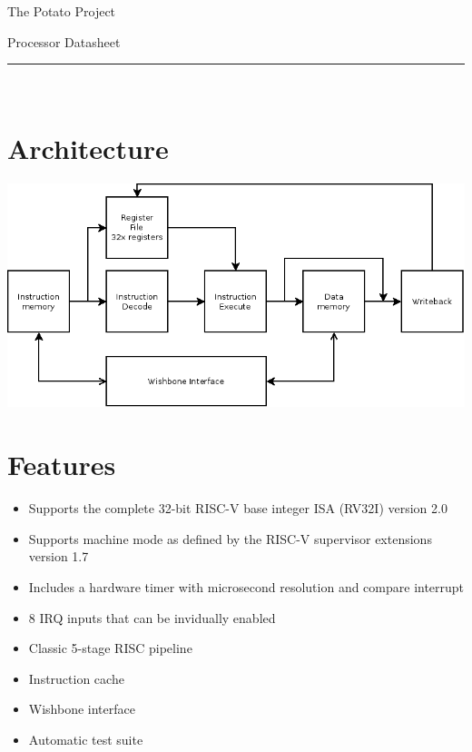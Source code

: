 \documentclass[10pt,a4paper]{article}
\begin{document}
\begin{minipage}{0.5\textwidth}
\raggedright\huge
\textsf{The Potato Project}
\end{minipage}
\begin{minipage}{0.5\textwidth}
\raggedleft\huge
\textsf{Processor Datasheet}
\end{minipage}

\vspace{0.5em}
\noindent\rule{\linewidth}{1pt}\\

\begin{minipage}[t]{0.48\textwidth}

\section{Architecture}
\includegraphics[width=\textwidth]{diagram.png}

\section{Features}

\begin{itemize}
\item Supports the complete 32-bit RISC-V base integer ISA (RV32I) version 2.0
\item Supports machine mode as defined by the RISC-V supervisor extensions version 1.7
\item Includes a hardware timer with microsecond resolution and compare interrupt
\item 8 IRQ inputs that can be invidually enabled
\item Classic 5-stage RISC pipeline
\item Instruction cache
\item Wishbone interface
\item Automatic test suite
\end{itemize}


\end{minipage}
\end{document}
